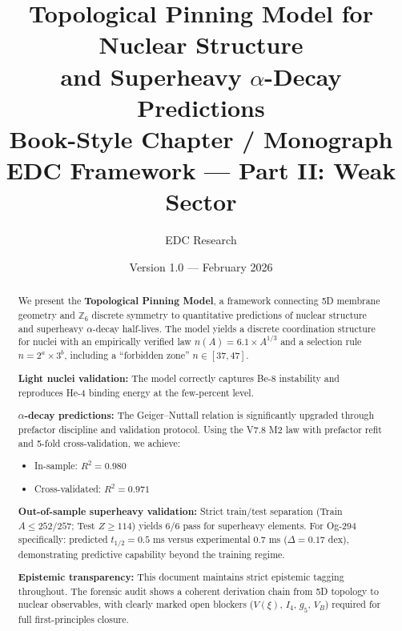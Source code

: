 \documentclass[11pt,a4paper]{article}
\title{%
    \textbf{Topological Pinning Model for Nuclear Structure}\\[0.5em]
    \Large and Superheavy $\alpha$-Decay Predictions\\[1em]
    \large Book-Style Chapter / Monograph\\[0.5em]
    \normalsize EDC Framework --- Part II: Weak Sector
}
\author{EDC Research}
\date{Version 1.0 --- February 2026}
\begin{document}
\maketitle


\begin{abstract}
\noindent
We present the \textbf{Topological Pinning Model}, a framework connecting 5D membrane geometry and $\mathbb{Z}_6$ discrete symmetry to quantitative predictions of nuclear structure and superheavy $\alpha$-decay half-lives. The model yields a discrete coordination structure for nuclei with an empirically verified law $n(A) = 6.1 \times A^{1/3}$ and a selection rule $n = 2^a \times 3^b$, including a ``forbidden zone'' $n \in [37, 47]$.

\textbf{Light nuclei validation:} The model correctly captures Be-8 instability and reproduces He-4 binding energy at the few-percent level.

\textbf{$\alpha$-decay predictions:} The Geiger--Nuttall relation is significantly upgraded through prefactor discipline and validation protocol. Using the V7.8 M2 law with prefactor refit and 5-fold cross-validation, we achieve:
\begin{itemize}[nosep]
    \item In-sample: $R^2 = 0.980$
    \item Cross-validated: $R^2 = 0.971$
\end{itemize}

\textbf{Out-of-sample superheavy validation:} Strict train/test separation (Train $A \leq 252/257$; Test $Z \geq 114$) yields 6/6 pass for superheavy elements. For Og-294 specifically: predicted $t_{1/2} = 0.5$ ms versus experimental 0.7 ms ($\Delta = 0.17$ dex), demonstrating predictive capability beyond the training regime.

\textbf{Epistemic transparency:} This document maintains strict epistemic tagging throughout. The forensic audit shows a coherent derivation chain from 5D topology to nuclear observables, with clearly marked open blockers ($V(\xi)$, $I_4$, $g_5$, $V_B$) required for full first-principles closure.

\end{abstract}

\newpage

\end{document}
